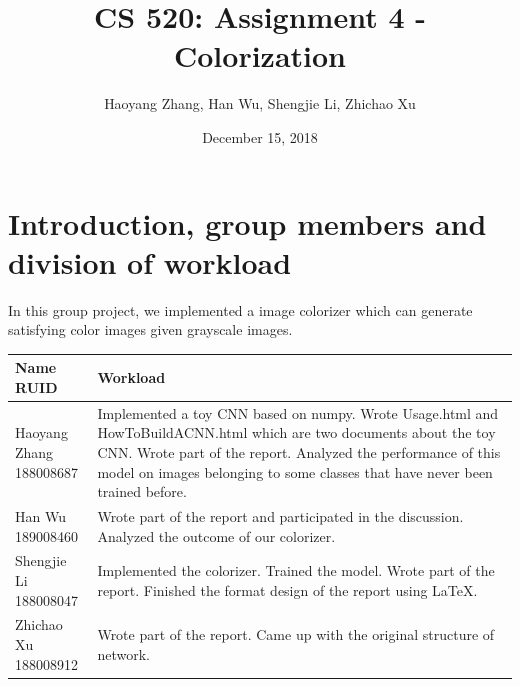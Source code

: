 \documentclass[letter]{article}
\title{CS 520: Assignment 4 - Colorization}
\author{Haoyang Zhang, Han Wu, Shengjie Li, Zhichao Xu}
\date{December 15, 2018}
\begin{document}
\maketitle

\section{Introduction, group members and division of workload}
\label{sec:Introduction}

In this group project, we implemented a image colorizer which can generate satisfying color images given grayscale images. \\
\begin{tabular}{| p{2.5cm} | p{\textwidth -3.5cm} |}
	\hline
	\makecell[c]{Name \\ RUID} & Workload \\
	\hline
	\makecell[c]{Haoyang Zhang \\ 188008687} & {Implemented a toy CNN based on numpy. Wrote Usage.html and HowToBuildACNN.html which are two documents about the toy CNN. Wrote part of the report. Analyzed the performance of this model on images belonging to some classes that have never been trained before.} \\
	\hline
	\makecell[c]{Han Wu \\ 189008460} & {Wrote part of the report and participated in the discussion. Analyzed the outcome of our colorizer.} \\
	\hline
	\makecell[c]{Shengjie Li \\ 188008047} & {Implemented the colorizer. Trained the model. Wrote part of the report. Finished the format design of the report using \LaTeX. } \\
	\hline
	\makecell[c]{Zhichao Xu \\ 188008912} & {Wrote part of the report. Came up with the original structure of network.} \\
	\hline
\end{tabular}
\end{document}

